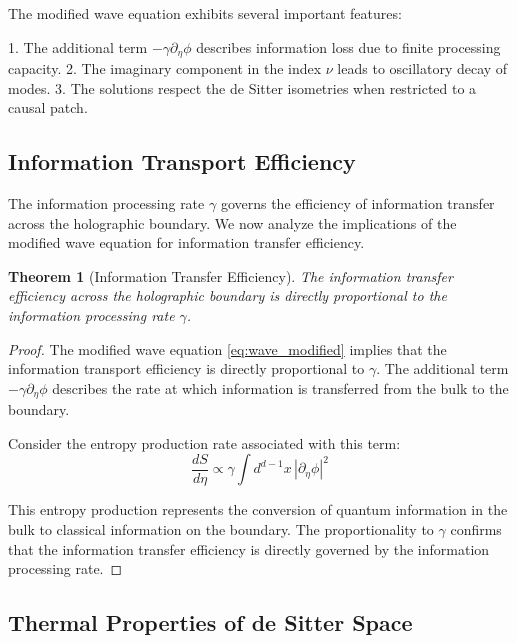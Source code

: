 \documentclass[11pt,english,twoside]{article}
\theoremstyle{plain}
\newtheorem{theorem}{Theorem}[section]
\theoremstyle{definition}
\theoremstyle{remark}
\newcommand{\gammaR}{\gamma}
\begin{document}
The modified wave equation exhibits several important features:

1. The additional term $-\gammaR \partial_\eta\phi$ describes information loss due to finite processing capacity.
2. The imaginary component in the index $\nu$ leads to oscillatory decay of modes.
3. The solutions respect the de Sitter isometries when restricted to a causal patch.

\subsection{Information Transport Efficiency}
\label{subsec:info_transfer}

The information processing rate $\gammaR$ governs the efficiency of information transfer across the holographic boundary. We now analyze the implications of the modified wave equation for information transfer efficiency.

\begin{theorem}[Information Transfer Efficiency]
\label{thm:info_transfer}
The information transfer efficiency across the holographic boundary is directly proportional to the information processing rate $\gammaR$.
\end{theorem}

\begin{proof}
The modified wave equation \eqref{eq:wave_modified} implies that the information transport efficiency is directly proportional to $\gammaR$. The additional term $-\gammaR \partial_\eta\phi$ describes the rate at which information is transferred from the bulk to the boundary.

Consider the entropy production rate associated with this term:
\begin{equation}
\frac{dS}{d\eta} \propto \gammaR \int d^{d-1}x \, |\partial_\eta\phi|^2
\end{equation}

This entropy production represents the conversion of quantum information in the bulk to classical information on the boundary. The proportionality to $\gammaR$ confirms that the information transfer efficiency is directly governed by the information processing rate.
\end{proof}

\subsection{Thermal Properties of de Sitter Space}
\label{subsec:thermal_properties}
\end{document}

